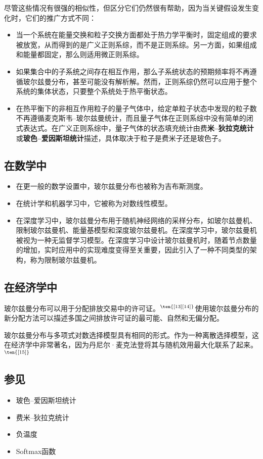 尽管这些情况有很强的相似性，但区分它们仍然很有帮助，因为当关键假设发生变化时，它们的推广方式不同：
\begin{itemize}
\item 当一个系统在能量交换和粒子交换方面都处于热力学平衡时，固定组成的要求被放宽，从而得到的是广义正则系综，而不是正则系综。另一方面，如果组成和能量都固定，那么则适用微正则系综。  
\item 如果集合中的子系统之间存在相互作用，那么子系统状态的预期频率将不再遵循玻尔兹曼分布，甚至可能没有解析解。然而，正则系综仍然可以应用于整个系统的集体状态，只要整个系统处于热平衡状态。  
\item 在热平衡下的非相互作用粒子的量子气体中，给定单粒子状态中发现的粒子数不再遵循麦克斯韦–玻尔兹曼统计，而且量子气体在正则系综中没有简单的闭式表达式。在广义正则系综中，量子气体的状态填充统计由费\textbf{米–狄拉克统计}或\textbf{玻色–爱因斯坦统计}描述，具体取决于粒子是费米子还是玻色子。 
\end{itemize} 
\subsection{在数学中}
\begin{itemize}
\item 在更一般的数学设置中，玻尔兹曼分布也被称为吉布斯测度。  
\item 在统计学和机器学习中，它被称为对数线性模型。  
\item 在深度学习中，玻尔兹曼分布用于随机神经网络的采样分布，如玻尔兹曼机、限制玻尔兹曼机、能量基模型和深度玻尔兹曼机。在深度学习中，玻尔兹曼机被视为一种无监督学习模型。在深度学习中设计玻尔兹曼机时，随着节点数量的增加，实时应用中的实现难度变得至关重要，因此引入了一种不同类型的架构，称为限制玻尔兹曼机。
\end{itemize}
\subsection{在经济学中}  
玻尔兹曼分布可以用于分配排放交易中的许可证。\(^\ten{[13][14]}\)使用玻尔兹曼分布的新分配方法可以描述多国之间排放许可证的最可能、自然和无偏分配。

玻尔兹曼分布与多项式对数选择模型具有相同的形式。作为一种离散选择模型，这在经济学中非常著名，因为丹尼尔·麦克法登将其与随机效用最大化联系了起来。\(^\ten{[15]}\)
\subsection{参见}  
\begin{itemize}
\item 玻色–爱因斯坦统计  
\item 费米–狄拉克统计  
\item 负温度  
\item Softmax函数
\end{itemize}
